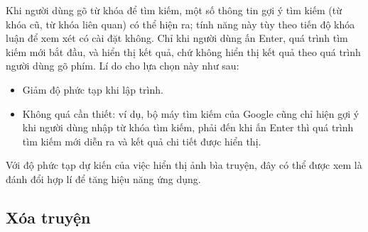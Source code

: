 \documentclass[../../thesis]{subfiles}
\begin{document}
Khi người dùng gõ từ khóa để tìm kiếm, một số thông tin gợi ý tìm kiếm (từ khóa
cũ, từ khóa liên quan) có thể hiện ra; tính năng này tùy theo tiến độ khóa luận
để xem xét có cài đặt không. Chỉ khi người dùng ấn Enter, quá trình tìm kiếm mới
bắt đầu, và hiển thị kết quả, chứ không hiển thị kết quả theo quá trình người
dùng gõ phím. Lí do cho lựa chọn này như sau:

\begin{itemize}
    \item
        Giảm độ phức tạp khi lập trình.
    \item
        Không quá cần thiết: ví dụ, bộ máy tìm kiếm của Google cũng chỉ hiện gợi
        ý khi người dùng nhập từ khóa tìm kiếm, phải đến khi ấn Enter thì quá
        trình tìm kiếm mới diễn ra và kết quả chi tiết được hiển thị.
\end{itemize}

Với độ phức tạp dự kiến của việc hiển thị ảnh bìa truyện, đây có thể được xem là
đánh đổi hợp lí để tăng hiệu năng ứng dụng.

\subsection{Xóa truyện}\label{sec:delete-comic}
\end{document}
